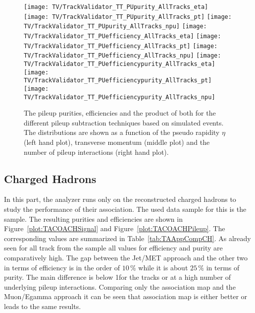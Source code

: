 \begin{figure}[h!t]
  \centering
  \texttt{[image: TV/TrackValidator\_TT\_PUpurity\_AllTracks\_eta]}
  \texttt{[image: TV/TrackValidator\_TT\_PUpurity\_AllTracks\_pt]}
  \texttt{[image: TV/TrackValidator\_TT\_PUpurity\_AllTracks\_npu]}
  \newline
  \texttt{[image: TV/TrackValidator\_TT\_PUefficiency\_AllTracks\_eta]}
  \texttt{[image: TV/TrackValidator\_TT\_PUefficiency\_AllTracks\_pt]}
  \texttt{[image: TV/TrackValidator\_TT\_PUefficiency\_AllTracks\_npu]}
  \newline
  \texttt{[image: TV/TrackValidator\_TT\_PUefficiencypurity\_AllTracks\_eta]}
  \texttt{[image: TV/TrackValidator\_TT\_PUefficiencypurity\_AllTracks\_pt]}
  \texttt{[image: TV/TrackValidator\_TT\_PUefficiencypurity\_AllTracks\_npu]}
  \caption[Pileup purity, efficiency and their product for the different pileup subtraction techniques based on simulated \ttbar events]{The pileup purities, efficiencies and the product of both for the different pileup subtraction techniques based on simulated \ttbar events. The distributions are shown as a function of the pseudo rapidity $\eta$ (left hand plot), transverse momentum (middle plot) and the number of pileup interactions (right hand plot). \label{plot:TACOAACPTTPileup}}
\end{figure}




\subsection{Charged Hadrons \label{sec:TASEFRDACH}}

In this part, the analyzer runs only on the reconstructed charged hadrons to study the performance of their association. The used data sample for this is the \ttbar sample. The resulting purities and efficiencies are shown in Figure~\ref{plot:TACOACHSignal} and Figure~\ref{plot:TACOACHPileup}.  The corresponding values are summarized in Table~\ref{tab:TAAppCompCH}. As already seen for all track from the \ttbar sample all values for efficiency and purity are comparatively high. The gap between the Jet/MET approach and the other two in terms of efficiency is in the order of $10\,\%$ while it is about $25\,\%$ in terms of purity. The main difference is below 1\GeV for the tracks \pt or at a high number of underlying pileup interactions. Comparing only the association map and the Muon/Egamma approach it can be seen that association map is either better or leads to the same results. 

